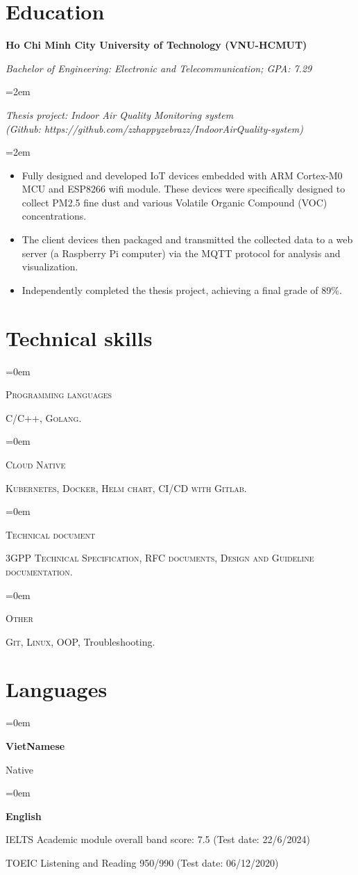 \documentclass[10pt]{article}
\newlength{\spacebox}
\newcommand{\skill}[2]{
\noindent\hangindent=0em\hangafter=0
\parbox{3\spacebox}{%
\textsc{#1}} %
#2 \par} %
\newcommand{\lan}[2]{
    \noindent\hangindent=0em\hangafter=0
    \parbox{3\spacebox}{%
        \textbf{#1}} %
     #2 \par}    %
\newcommand{\education}[4]{

  \noindent  \textbf{#1}
    \hfill 
    \framebox{%
    \parbox{9em}{%
    \centering\textbf{#2}}} \par
     \noindent \textit{#3} \par
     \vspace*{0.5em}
     \noindent\hangindent=2em\hangafter=0 \small #4 
\normalsize \par}
\newcommand{\project}[3]{
  \noindent \textbf{#1} \par
  \noindent \textit{#2} \par
  \vspace*{0.5em}
  \noindent\hangindent=2em\hangafter=0 \small #3
  \normalsize \par
}
\begin{document}
\section*{Education}
\education{Ho Chi Minh City University of Technology (VNU-HCMUT)}
{Aug 2017--Nov 2021}
{Bachelor of Engineering: Electronic and Telecommunication; GPA: 7.29}
{}
\project{}
{Thesis project: Indoor Air Quality Monitoring system \\(Github: https://github.com/zzhappyzebrazz/IndoorAirQuality-system)}
{
  \begin{itemize}
    \item Fully designed and developed IoT devices embedded with ARM Cortex-M0 MCU and ESP8266 wifi module.
     These devices were specifically designed to collect PM2.5 fine dust and various Volatile Organic Compound (VOC) concentrations.
     \item The client devices then packaged and transmitted the collected data to a web server (a Raspberry Pi computer) via the MQTT protocol for analysis and visualization.
     \item Independently completed the thesis project, achieving a final grade of 89\%.
  \end{itemize}
}
{}

\section*{Technical skills}
\skill{Programming languages}{\textsc{C/C++}, \textsc{Golang}.}
\skill{Cloud Native}{\textsc{Kubernetes, Docker, Helm chart, CI/CD with Gitlab.}}
\skill{Technical document}{\textsc{3GPP Technical Specification, RFC documents, Design and Guideline documentation.}}
\skill{Other}{\textsc{Git, Linux, OOP,} Troubleshooting.}

\section*{Languages}
\lan{VietNamese}{Native}
\lan{English}{IELTS Academic module overall band score: 7.5 (Test date: 22/6/2024)

\hspace{4.2cm} TOEIC Listening and Reading 950/990 (Test date: 06/12/2020)}
\end{document}
